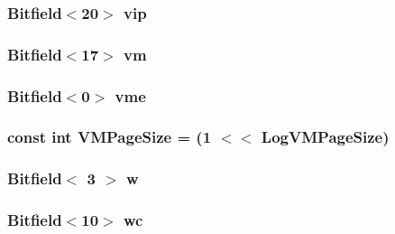 \hypertarget{namespaceX86ISA_ac1f0b7dc43bc9390bc21788a3479a091}{
\subsubsection[{vip}]{\setlength{\rightskip}{0pt plus 5cm}Bitfield$<$20$>$ {\bf vip}}}
\label{namespaceX86ISA_ac1f0b7dc43bc9390bc21788a3479a091}
\hypertarget{namespaceX86ISA_aec9cf4531f16ea53778450574a6e6a68}{
\subsubsection[{vm}]{\setlength{\rightskip}{0pt plus 5cm}Bitfield$<$17$>$ {\bf vm}}}
\label{namespaceX86ISA_aec9cf4531f16ea53778450574a6e6a68}
\hypertarget{namespaceX86ISA_ab59380367409ca4c8224a45b9845d0c8}{
\subsubsection[{vme}]{\setlength{\rightskip}{0pt plus 5cm}Bitfield$<$0$>$ {\bf vme}}}
\label{namespaceX86ISA_ab59380367409ca4c8224a45b9845d0c8}
\hypertarget{namespaceX86ISA_a891eaf95159d764e6efae501c2860a3a}{
\subsubsection[{VMPageSize}]{\setlength{\rightskip}{0pt plus 5cm}const int {\bf VMPageSize} = (1 $<$$<$ {\bf LogVMPageSize})}}
\label{namespaceX86ISA_a891eaf95159d764e6efae501c2860a3a}
\hypertarget{namespaceX86ISA_ad99fa3b4cc4da86ab4f09dbadd5048af}{
\subsubsection[{w}]{\setlength{\rightskip}{0pt plus 5cm}Bitfield$<$ 3 $>$ {\bf w}}}
\label{namespaceX86ISA_ad99fa3b4cc4da86ab4f09dbadd5048af}
\hypertarget{namespaceX86ISA_ad0682dae36178efd9d37d2734c608898}{
\subsubsection[{wc}]{\setlength{\rightskip}{0pt plus 5cm}Bitfield$<$10$>$ {\bf wc}}}
